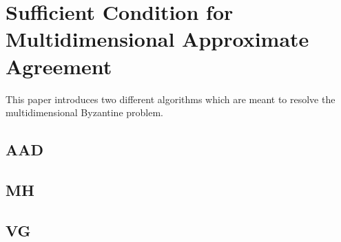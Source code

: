 \section{Sufficient Condition for Multidimensional Approximate Agreement}
This paper introduces two different algorithms which are meant to resolve
the multidimensional Byzantine problem. 
\subsection{AAD}
\subsection{MH}
\subsection{VG}

